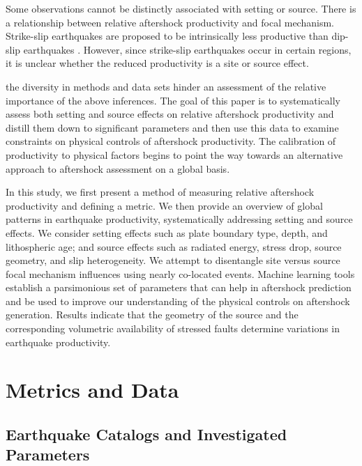 \documentclass[draft, jgrga]{agujournal2018}
\begin{document}
Some observations cannot be distinctly associated with setting or source. There is a relationship between relative aftershock productivity and focal mechanism. Strike-slip earthquakes are proposed to be intrinsically less productive than dip-slip earthquakes \citep{Tahir2012, Tahir2014Aftershock2005, Tahir2015}. However, since strike-slip earthquakes occur in certain regions, it is unclear whether the reduced productivity is a site or source effect.

 the diversity in methods and data sets hinder an assessment of the relative importance of the above inferences. The goal of this paper is to systematically assess both setting and source effects on relative aftershock productivity and distill them down to significant parameters and then use this data to examine constraints on physical controls of aftershock productivity.  The calibration of productivity to physical factors begins to point the way towards an alternative approach to aftershock assessment on a global basis. 

In this study, we first present a method of measuring relative aftershock productivity and defining a metric. We then provide an overview of global patterns in earthquake productivity, systematically addressing setting and source effects. We consider setting effects such as plate boundary type, depth, and lithospheric age; and source effects such as radiated energy, stress drop, source geometry, and slip heterogeneity.  We attempt to disentangle site versus source focal mechanism influences using nearly co-located events. Machine learning tools establish a parsimonious set of parameters that can help in aftershock prediction and be used to improve our understanding of the physical controls on aftershock generation. Results indicate that the geometry of the source and the corresponding volumetric availability of stressed faults determine variations in earthquake productivity.

\section{Metrics and Data}
   
\subsection{Earthquake Catalogs and Investigated Parameters}
\end{document}
